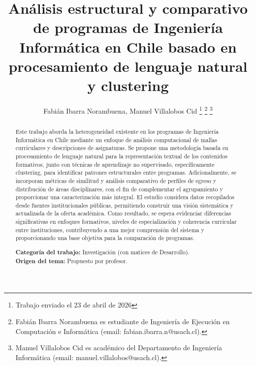 \documentclass[journal,twoside,web]{ieeecolor}
\begin{document}
\title{Análisis estructural y comparativo de programas de Ingeniería Informática en Chile basado en procesamiento de lenguaje natural y clustering}



    
\author{Fabián Ibarra Norambuena, Manuel Villalobos Cid
\thanks{Trabajo enviado el 23 de abril de 2026}
\thanks{Fabián Ibarra Norambuena es estudiante de Ingeniería de Ejecución en Computación e Informática (email: fabian.ibarra.n@usach.cl).}
\thanks{Manuel Villalobos Cid es académico del Departamento de Ingeniería Informática (email: manuel.villalobos@usach.cl).}
}

\maketitle

    
\begin{abstract}
Este trabajo aborda la heterogeneidad existente en los programas de Ingeniería Informática en Chile mediante un enfoque de análisis computacional de mallas curriculares y descripciones de asignaturas. Se propone una metodología basada en procesamiento de lenguaje natural para la representación textual de los contenidos formativos, junto con técnicas de aprendizaje no supervisado, específicamente clustering, para identificar patrones estructurales entre programas. Adicionalmente, se incorporan métricas de similitud y análisis comparativo de perfiles de egreso y distribución de áreas disciplinares, con el fin de complementar el agrupamiento y proporcionar una caracterización más integral. El estudio considera datos recopilados desde fuentes institucionales públicas, permitiendo construir una visión sistemática y actualizada de la oferta académica. Como resultado, se espera evidenciar diferencias significativas en enfoques formativos, niveles de especialización y coherencia curricular entre instituciones, contribuyendo a una mejor comprensión del sistema y proporcionando una base objetiva para la comparación de programas.

\noindent \textbf{Categoría del trabajo:} Investigación (con matices de Desarrollo). \\
\textbf{Origen del tema:} Propuesto por profesor.
\end{abstract}
\end{document}
